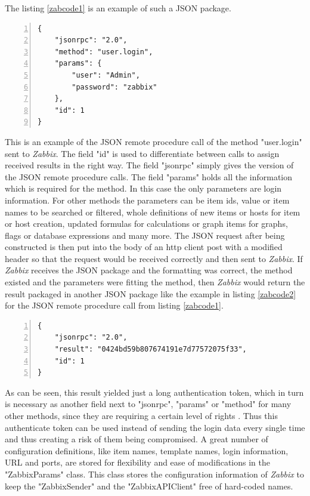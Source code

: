 The listing \ref{zabcode1} is an example of such a JSON package.
\begin{lstlisting}[language=json_sw,caption={JSON authentication request\cite{zab3}},captionpos=b,numbers=left,label=zabcode1]
{
    "jsonrpc": "2.0",
    "method": "user.login",
    "params": {
        "user": "Admin",
        "password": "zabbix"
    },
    "id": 1
}\end{lstlisting} 
	This is an example of the JSON remote procedure call of the method "user.login" sent to \textit{Zabbix}. The field "id" is used to differentiate between calls to assign received results in the right way. The field "jsonrpc" simply gives the version of the JSON remote procedure calls. The field "params" holds all the information which is required for the method. In this case the only parameters are login information. For other methods the parameters can be item ids, value or item names to be searched or filtered, whole definitions of new items or hosts for item or host creation, updated formulas for calculations or graph items for graphs, flags or database expressions and many more. The JSON request after being constructed is then put into the body of an http client post with a modified header so that the request would be received correctly and then sent to \textit{Zabbix}. If \textit{Zabbix} receives the JSON package and the formatting was correct, the method existed and the parameters were fitting the method, then \textit{Zabbix} would return the result packaged in another JSON package like the example in listing \ref{zabcode2} for the JSON remote procedure call from listing \ref{zabcode1}.
	\begin{lstlisting}[language=json_sw,caption={JSON authentication response\cite{zab3}},captionpos=b,numbers=left,label=zabcode2]
{
    "jsonrpc": "2.0",
    "result": "0424bd59b807674191e7d77572075f33",
    "id": 1
}
\end{lstlisting}
	As can be seen, this result yielded just a long authentication token, which in turn is necessary as another field next to "jsonrpc", "params" or "method" for many other methods, since they are requiring a certain level of rights \cite{zab3}. Thus this authenticate token can be used instead of sending the login data every single time and thus creating a risk of them being compromised.
	A great number of configuration definitions, like item names, template names, login information, URL and ports, are stored for flexibility and ease of modifications in the "ZabbixParams" class. This class stores the configuration information of \textit{Zabbix} to keep the "ZabbixSender" and the "ZabbixAPIClient" free of hard-coded names.
